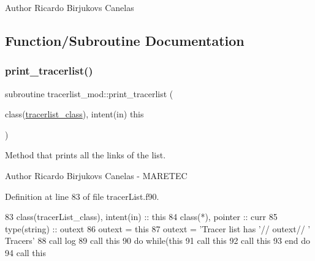 \begin{DoxyAuthor}{Author}
Ricardo Birjukovs Canelas 
\end{DoxyAuthor}


\subsection{Function/\+Subroutine Documentation}
\mbox{\label{namespacetracerlist__mod_ae45210a1a3aa4111f97deb5ecf811ca5}} 
\subsubsection{\texorpdfstring{print\+\_\+tracerlist()}{print\_tracerlist()}}
{\footnotesize\ttfamily subroutine tracerlist\+\_\+mod\+::print\+\_\+tracerlist (\begin{DoxyParamCaption}\item[{class(\mbox{\hyperlink{structtracerlist__mod_1_1tracerlist__class}{tracerlist\+\_\+class}}), intent(in)}]{this }\end{DoxyParamCaption})\hspace{0.3cm}{\ttfamily [private]}}



Method that prints all the links of the list. 

\begin{DoxyAuthor}{Author}
Ricardo Birjukovs Canelas -\/ M\+A\+R\+E\+T\+EC 
\end{DoxyAuthor}


Definition at line 83 of file tracer\+List.\+f90.


\begin{DoxyCode}
83     \textcolor{keywordtype}{class}(tracerList\_class), \textcolor{keywordtype}{intent(in)} :: this
84     \textcolor{keywordtype}{class}(*), \textcolor{keywordtype}{pointer} :: curr
85     \textcolor{keywordtype}{type}(string) :: outext
86     outext = this%
87     outext = \textcolor{stringliteral}{'Tracer list has '}// outext// \textcolor{stringliteral}{' Tracers'}
88     \textcolor{keyword}{call }log%
89     \textcolor{keyword}{call }this%
90     \textcolor{keywordflow}{do} \textcolor{keywordflow}{while}(this%
91         \textcolor{keyword}{call }this%
92         \textcolor{keyword}{call }this%
93 \textcolor{keywordflow}{    end do}
94     \textcolor{keyword}{call }this%
\end{DoxyCode}
\mbox{\label{namespacetracerlist__mod_a4476a16f089c0b6e249e7136f73b510c}} 
